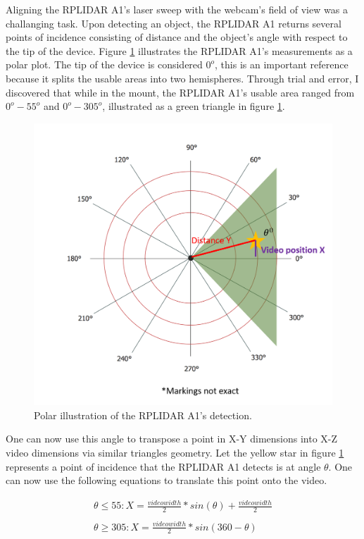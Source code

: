 \documentclass[onecolumn, draftclsnofoot,10pt, compsoc]{IEEEtran}
\makeatletter
\newcommand\captionof[1]{\def\@captype{#1}\caption}
\makeatother
\begin{document}
\begin{singlespace}
		Aligning the RPLIDAR A1's laser sweep with the webcam's field of view was a challanging task.
		Upon detecting an object, the RPLIDAR A1 returns several points of incidence consisting of distance and the object's angle with respect to the tip of the device.
		Figure \ref{polar} illustrates the RPLIDAR A1's measurements as a polar plot.
		The tip of the device is considered \( 0^o \), this is an important reference because it splits the usable areas into two hemispheres.
		Through trial and error, I discovered that while in the mount, the RPLIDAR A1's usable area ranged from \( 0^o - 55^o\) and \( 0^o - 305^o\), illustrated as a green triangle in figure \ref{polar}.

		\begin{figure}[H]
		\includegraphics[scale=0.3]{polar.png}
		\captionof{figure}{Polar illustration of the RPLIDAR A1's detection.}
		\label{polar}
		\end{figure}


		One can now use this angle to transpose a point in X-Y dimensions into X-Z video dimensions via similar triangles geometry.
		Let the yellow star in figure \ref{polar} represents a point of incidence that the RPLIDAR A1 detects is at angle \( \theta\).
		One can now use the following equations to translate this point onto the video.


\begin{equation} \label{eq1}
\begin{aligned}
\theta \leq  55:
X = \frac{video width}{2} * sin(\theta) + \frac{video width}{2}\\
\\
\theta \geq 305:
X = \frac{video width}{2} * sin(360 - \theta)\\
\end{aligned}
\end{equation}


\end{singlespace}
\end{document}
